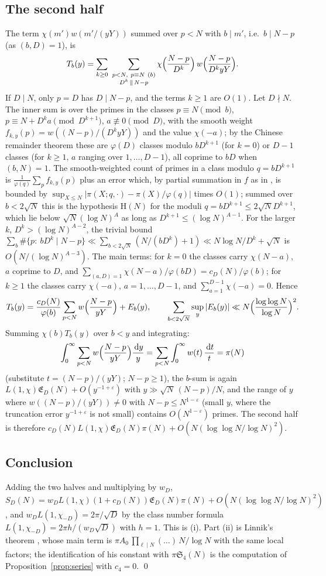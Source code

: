 \documentclass[11pt]{amsart}
\theoremstyle{definition}
\theoremstyle{remark}
\newcommand{\e}{\varepsilon}
\newcommand{\dd}{\,\mathrm d}
\newcommand{\sS}{\mathfrak S}
\newcommand{\sE}{\mathfrak E}
\begin{document}
\subsection{The second half}
The term $\chi(m')w(m'/(yY))$ summed over $p<N$ with $b\mid m'$, i.e.\ $b\mid N-p$ (as $(b,D)=1$), is
\[
T_b(y)=\sum_{k\ge0}\ \sum_{\substack{p<N,\ p\equiv N\ (b)\\ D^k\,\|\,N-p}}\chi\Bigl(\frac{N-p}{D^k}\Bigr)\,w\Bigl(\frac{N-p}{D^kyY}\Bigr).
\]
If $D\mid N$, only $p=D$ has $D\mid N-p$, and the terms $k\ge1$ are $O(1)$. Let $D\nmid N$. The inner sum is over the primes in the classes $p\equiv N\pmod b$, $p\equiv N+D^ka\pmod{D^{k+1}}$, $a\not\equiv0\pmod D$, with the smooth weight $f_{k,y}(p)=w((N-p)/(D^kyY))$ and the value $\chi(-a)$; by the Chinese remainder theorem these are $\varphi(D)$ classes modulo $bD^{k+1}$ (for $k=0$) or $D-1$ classes (for $k\ge1$, $a$ ranging over $1,\dots,D-1$), all coprime to $bD$ when $(b,N)=1$. The smooth-weighted count of primes in a class modulo $q=bD^{k+1}$ is $\frac1{\varphi(q)}\sum_pf_{k,y}(p)$ plus an error which, by partial summation in $f$ as in \cite[Lemma~3.1]{FI18}, is bounded by $\sup_{X\le N}|\pi(X;q,\cdot)-\pi(X)/\varphi(q)|$ times $O(1)$; summed over $b<2\sqrt N$ this is the hypothesis $\mathrm H(N)$ for the moduli $q=bD^{k+1}\le2\sqrt N D^{k+1}$, which lie below $\sqrt N(\log N)^A$ as long as $D^{k+1}\le(\log N)^{A-1}$. For the larger $k$, $D^{k}>(\log N)^{A-2}$, the trivial bound $\sum_{b}\#\{p:\ bD^k\mid N-p\}\ll\sum_{b<2\sqrt N}(N/(bD^k)+1)\ll N\log N/D^k+\sqrt N$ is $O(N/(\log N)^{A-3})$. The main terms: for $k=0$ the classes carry $\chi(N-a)$, $a$ coprime to $D$, and $\sum_{(a,D)=1}\chi(N-a)/\varphi(bD)=c_D(N)/\varphi(b)$; for $k\ge1$ the classes carry $\chi(-a)$, $a=1,\dots,D-1$, and $\sum_{a=1}^{D-1}\chi(-a)=0$. Hence
\[
T_b(y)=\frac{c_D(N)}{\varphi(b)}\sum_{p<N}w\Bigl(\frac{N-p}{yY}\Bigr)+E_b(y),\qquad \sum_{b<2\sqrt N}\sup_y|E_b(y)|\ll N\Bigl(\frac{\log\log N}{\log N}\Bigr)^2 .
\]
Summing $\chi(b)T_b(y)$ over $b<y$ and integrating:
\[
\int_0^\infty\sum_{p<N}w\Bigl(\frac{N-p}{yY}\Bigr)\frac{\dd y}y=\sum_{p<N}\int_0^\infty w(t)\,\frac{\dd t}t=\pi(N)
\]
(substitute $t=(N-p)/(yY)$; $N-p\ge1$), the $b$-sum is again $L(1,\chi)\sE_D(N)+O(y^{-1+\e})$ with $y\gg\sqrt N\,(N-p)/N$, and the range of $y$ where $w((N-p)/(yY))\ne0$ with $N-p\le N^{1-\e}$ (small $y$, where the truncation error $y^{-1+\e}$ is not small) contains $O(N^{1-\e})$ primes. The second half is therefore $c_D(N)L(1,\chi)\sE_D(N)\pi(N)+O(N(\log\log N/\log N)^2)$.

\subsection{Conclusion}
Adding the two halves and multiplying by $w_D$, $S_D(N)=w_DL(1,\chi)(1+c_D(N))\sE_D(N)\pi(N)+O(N(\log\log N/\log N)^2)$, and $w_DL(1,\chi_{-D})=2\pi/\sqrt D$ by the class number formula $L(1,\chi_{-D})=2\pi h/(w_D\sqrt D)$ with $h=1$. This is (i). Part (ii) is Linnik's theorem \cite[Chapter~7]{Linnik}, whose main term is $\pi A_0\,\prod_{\ell\mid N}(\dots)\,N/\log N$ with the same local factors; the identification of his constant with $\pi\sS_4(N)$ is the computation of Proposition~\ref{prop:series} with $c_4=0$. \qed
\end{document}
